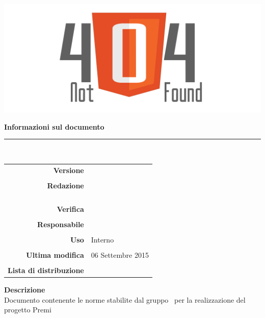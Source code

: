 \thispagestyle{empty}

\begin{titlepage}
	\begin{center}
	\begin{Huge}
		\textbf{\gruppo} \\
	\end{Huge}
	\vspace{0.5cm}
	\begin{Large}
		\textbf{\capitolato}
	\end{Large}
	
	\vspace{1cm}
    
	\includegraphics[scale=0.35]{../logo/logo404_Extends.png}
	\vspace{1cm}
	\begin{Huge}
		\textbf{\titDoc}
	\end{Huge}
	
	\vspace{1cm}
	\textbf{Informazioni sul documento}\\
    \rule{10cm}{.4pt} \\
	\begin{table}[h]
	\begin{center}
	\begin{tabular}{r | l}
		\textbf{Versione} & \versione \\ \\
		\textbf{Redazione} & \CoMa \\
			& \ReAn \\ 
			& \DeEn \\ 
			& \CaMa \\ \\
		\textbf{Verifica} &\DeEn \\ \\
		\textbf{Responsabile} & \CaMa \\ \\
		\textbf{Uso} & Interno \\ \\
		\textbf{Ultima modifica} & 06 Settembre 2015 \\ \\
		\textbf{Lista di distribuzione} & \gruppo \\ 
	\end{tabular}
	\end{center}
	\end{table}
			\textbf{Descrizione} \\
			Documento contenente le norme stabilite dal gruppo \gruppo\ per la realizzazione del progetto Premi
	\end{center}
\end{titlepage}